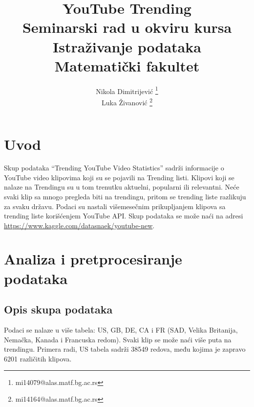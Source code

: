 \documentclass[a4paper]{article}
\theoremstyle{definition}
\begin{document}
\title{YouTube Trending\\ \small{Seminarski rad u okviru kursa\\Istraživanje podataka\\ Matematički fakultet}}

\author{Nikola Dimitrijević \footnote{mi14079@alas.matf.bg.ac.rs}\\
        Luka Živanović \footnote{mi14164@alas.matf.bg.ac.rs}\\
 }
\vspace*{-3cm}
    {\let\newpage\relax\maketitle}

\tableofcontents

\newpage



\section{Uvod}
\label{sec:uvod}

Skup podataka ``Trending YouTube Video Statistics'' sadrži informacije o YouTube video klipovima koji su se pojavili na Trending listi.
Klipovi koji se nalaze na Trendingu su u tom trenutku aktuelni, popularni ili relevantni. Neće svaki klip sa mnogo pregleda biti na trendingu,
 pritom se trending liste razlikuju za svaku državu. Podaci su nastali višemesečnim prikupljanjem klipova sa trending liste korišćenjem YouTube API.
Skup podataka se može naći na adresi \url{https://www.kaggle.com/datasnaek/youtube-new}.

\section{Analiza i pretprocesiranje podataka}


\label{sec:analiza}

\subsection{Opis skupa podataka}
Podaci se nalaze u više tabela: US, GB, DE,
CA i FR (SAD, Velika Britanija, Nemačka, Kanada i Francuska redom). 
Svaki klip se može naći više puta na trendingu.
Primera radi, US tabela sadrži 38549 redova, među kojima je zapravo  6201 različitih klipova.
\end{document}
